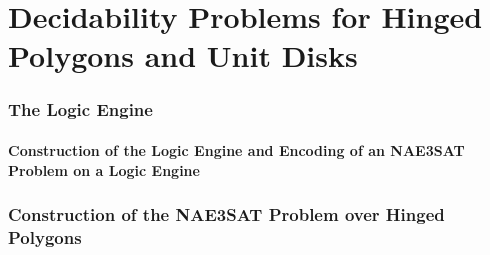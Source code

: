 \chapter{Decidability Problems for Hinged Polygons and Unit Disks}
\subsection{The Logic Engine}
\subsubsection{Construction of the Logic Engine and Encoding of an NAE3SAT Problem on a Logic 
Engine}
\subsection{Construction of the NAE3SAT Problem over Hinged Polygons}